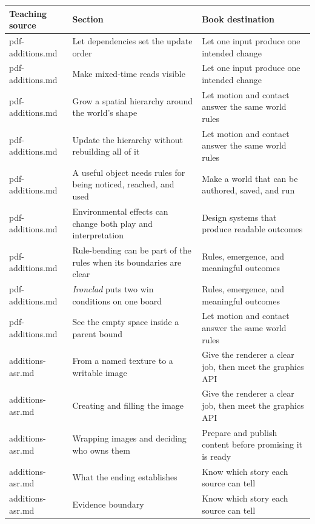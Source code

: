 {\def\LTcaptype{none} %
\begin{longtable}[]{@{}
  >{\raggedright\arraybackslash}p{}
  >{\raggedright\arraybackslash}p{}
  >{\raggedright\arraybackslash}p{}@{}}
\toprule\noalign{}
\begin{minipage}[b]{\linewidth}\raggedright
Teaching source
\end{minipage} & \begin{minipage}[b]{\linewidth}\raggedright
Section
\end{minipage} & \begin{minipage}[b]{\linewidth}\raggedright
Book destination
\end{minipage} \\
\midrule\noalign{}
\endhead
\bottomrule\noalign{}
\endlastfoot
pdf-additions.md & Let dependencies set the update order & Let one input produce one intended change \\
pdf-additions.md & Make mixed-time reads visible & Let one input produce one intended change \\
pdf-additions.md & Grow a spatial hierarchy around the world's shape & Let motion and contact answer the same world rules \\
pdf-additions.md & Update the hierarchy without rebuilding all of it & Let motion and contact answer the same world rules \\
pdf-additions.md & A useful object needs rules for being noticed, reached, and used & Make a world that can be authored, saved, and run \\
pdf-additions.md & Environmental effects can change both play and interpretation & Design systems that produce readable outcomes \\
pdf-additions.md & Rule-bending can be part of the rules when its boundaries are clear & Rules, emergence, and meaningful outcomes \\
pdf-additions.md & \emph{Ironclad} puts two win conditions on one board & Rules, emergence, and meaningful outcomes \\
pdf-additions.md & See the empty space inside a parent bound & Let motion and contact answer the same world rules \\
additions-asr.md & From a named texture to a writable image & Give the renderer a clear job, then meet the graphics API \\
additions-asr.md & Creating and filling the image & Give the renderer a clear job, then meet the graphics API \\
additions-asr.md & Wrapping images and deciding who owns them & Prepare and publish content before promising it is ready \\
additions-asr.md & What the ending establishes & Know which story each source can tell \\
additions-asr.md & Evidence boundary & Know which story each source can tell \\
\end{longtable}
}

